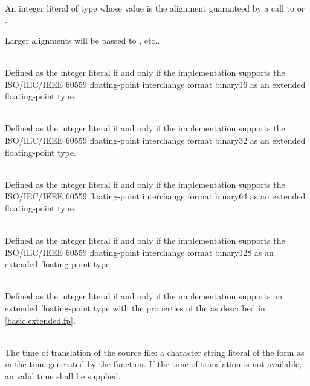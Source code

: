 \begin{description}
\item
{}%
\\
An integer literal of type 
whose value is the alignment guaranteed
by a call to 
or .
\begin{note}
Larger alignments will be passed to
, etc..
\end{note}

\item
{}%
\\
Defined as the integer literal 
if and only if the implementation supports
the ISO/IEC/IEEE 60559 floating-point interchange format binary16
as an extended floating-point type.

\item
{}%
\\
Defined as the integer literal 
if and only if the implementation supports
the ISO/IEC/IEEE 60559 floating-point interchange format binary32
as an extended floating-point type.

\item
{}%
\\
Defined as the integer literal 
if and only if the implementation supports
the ISO/IEC/IEEE 60559 floating-point interchange format binary64
as an extended floating-point type.

\item
{}%
\\
Defined as the integer literal 
if and only if the implementation supports
the ISO/IEC/IEEE 60559 floating-point interchange format binary128
as an extended floating-point type.

\item
{}%
\\
Defined as the integer literal 
if and only if the implementation supports an extended floating-point type
with the properties of the  
as described in \ref{basic.extended.fp}.

\item
{}%
\\
The time of translation of the source file:
a character string literal of the form
as in the time generated by the
function.
If the time of translation is not available,
an  valid time shall be supplied.
\end{description}

